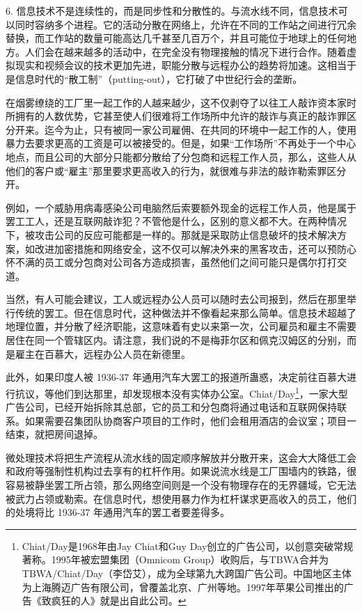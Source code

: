 6. 信息技术不是连续性的，而是同步性和分散性的。与流水线不同，信息技术可以同时容纳多个进程。它的活动分散在网络上，允许在不同的工作站之间进行冗余替换，而工作站的数量可能高达几千甚至几百万个，并且可能位于地球上的任何地方。人们会在越来越多的活动中，在完全没有物理接触的情况下进行合作。随着虚拟现实和视频会议的技术更加先进，职能分散与远程办公的趋势将加速。这相当于是信息时代的“散工制”（putting-out），它打破了中世纪行会的垄断。

在烟雾缭绕的工厂里一起工作的人越来越少，这不仅剥夺了以往工人敲诈资本家时所拥有的人数优势，它甚至使人们很难将工作场所中允许的敲诈与真正的敲诈罪区分开来。迄今为止，只有被同一家公司雇佣、在共同的环境中一起工作的人，使用暴力去要求更高的工资是可以被接受的。但是，如果“工作场所”不再处于一个中心地点，而且公司的大部分只能都分散给了分包商和远程工作人员，那么，这些人从他们的客户或“雇主”那里要求更高收入的行为，就很难与非法的敲诈勒索罪区分开。

例如，一个威胁用病毒感染公司电脑然后索要额外现金的远程工作人员，他是属于罢工工人，还是互联网敲诈犯？不管他是什么，区别的意义都不大。在两种情况下，被攻击公司的反应可能都是一样的。那就是采取防止信息破坏的技术解决方案，如改进加密措施和网络安全，这不仅可以解决外来的黑客攻击，还可以预防心怀不满的员工或分包商对公司各方造成损害，虽然他们之间可能只是偶尔打打交道。

当然，有人可能会建议，工人或远程办公人员可以随时去公司报到，然后在那里举行传统的罢工。但在信息时代，这种做法并不像看起来那么简单。信息技术超越了地理位置，并分散了经济职能，这意味着有史以来第一次，公司雇员和雇主不需要居住在同一个管辖区内。请注意，我们说的不是梅菲尔区和佩克汉姆区的分别，而是雇主在百慕大，远程办公人员在新德里。

此外，如果印度人被 1936-37 年通用汽车大罢工的报道所蛊惑，决定前往百慕大进行抗议，等他们到达那里，却发现根本没有实体办公室。Chiat/Day\footnote{Chiat/Day是1968年由Jay Chiat和Guy Day创立的广告公司，以创意突破常规著称。1995年被宏盟集团（Omnicom Group）收购后，与TBWA合并为TBWA/Chiat/Day（李岱艾），成为全球第九大跨国广告公司。中国地区主体为上海腾迈广告有限公司，曾覆盖北京、广州等地。1997年苹果公司推出的广告《致疯狂的人》就是出自此公司。}，一家大型广告公司，已经开始拆除其总部，它的员工和分包商将通过电话和互联网保持联系。如果需要召集团队协商客户项目的工作时，他们会租用酒店的会议室；项目一结束，就把房间退掉。

微处理技术将把生产流程从流水线的固定顺序解放并分散开来，这会大大降低工会和政府等强制性机构过去享有的杠杆作用。如果说流水线是工厂围墙内的铁路，很容易被静坐罢工所占领，那么网络空间则是一个没有物理存在的无界疆域，它无法被武力占领或勒索。在信息时代，想使用暴力作为杠杆谋求更高收入的员工，他们的处境将比 1936-37 年通用汽车的罢工者要差得多。

